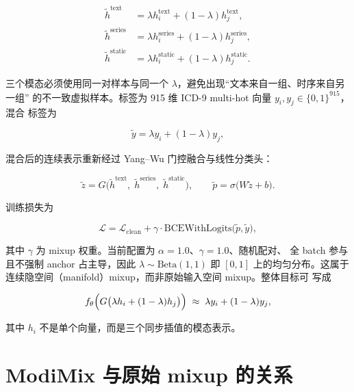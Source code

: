 \documentclass[11pt,a4paper]{article}
\theoremstyle{definition}
\begin{document}
\begin{align}
  \tilde{h}^{\text{text}}  &= \lambda h_i^{\text{text}}+(1-\lambda)h_j^{\text{text}},
  \label{eq:mix-text}\\
  \tilde{h}^{\text{series}} &= \lambda h_i^{\text{series}}+(1-\lambda)h_j^{\text{series}},
  \label{eq:mix-series}\\
  \tilde{h}^{\text{static}} &= \lambda h_i^{\text{static}}+(1-\lambda)h_j^{\text{static}}.
  \label{eq:mix-static}
\end{align}

三个模态必须使用同一对样本与同一个 $\lambda$，避免出现“文本来自一组、时序来自另一组”
的不一致虚拟样本。标签为 915 维 ICD-9 multi-hot 向量 $y_i,y_j\in\{0,1\}^{915}$，混合
标签为

\begin{equation}
  \tilde{y}=\lambda y_i+(1-\lambda)y_j,
  \label{eq:soft-label}
\end{equation}

混合后的连续表示重新经过 Yang--Wu 门控融合与线性分类头：

\begin{equation}
  \tilde{z}=G\bigl(\tilde{h}^{\text{text}},\;\tilde{h}^{\text{series}},\;\tilde{h}^{\text{static}}\bigr),
  \qquad
  \tilde{p}=\sigma\bigl(W\tilde{z}+b\bigr).
  \label{eq:predict}
\end{equation}

训练损失为

\begin{equation}
  \mathcal{L}=\mathcal{L}_{\text{clean}}+\gamma\cdot
  \mathrm{BCEWithLogits}\bigl(\tilde{p},\tilde{y}\bigr),
  \label{eq:loss}
\end{equation}

其中 $\gamma$ 为 mixup 权重。当前配置为 $\alpha=1.0$、$\gamma=1.0$、随机配对、
全 batch 参与且不强制 anchor 占主导，因此 $\lambda\sim\mathrm{Beta}(1,1)$ 即 $[0,1]$
上的均匀分布。这属于连续隐空间（manifold）mixup，而非原始输入空间 mixup。整体目标可
写成

\begin{equation}
  f_{\theta}\Bigl(G\bigl(\lambda h_i+(1-\lambda)h_j\bigr)\Bigr)
  \;\approx\;\lambda y_i+(1-\lambda)y_j,
  \label{eq:modimix-objective}
\end{equation}

其中 $h_i$ 不是单个向量，而是三个同步插值的模态表示。

\section{ModiMix 与原始 mixup 的关系}
\label{sec:relation}
\end{document}

